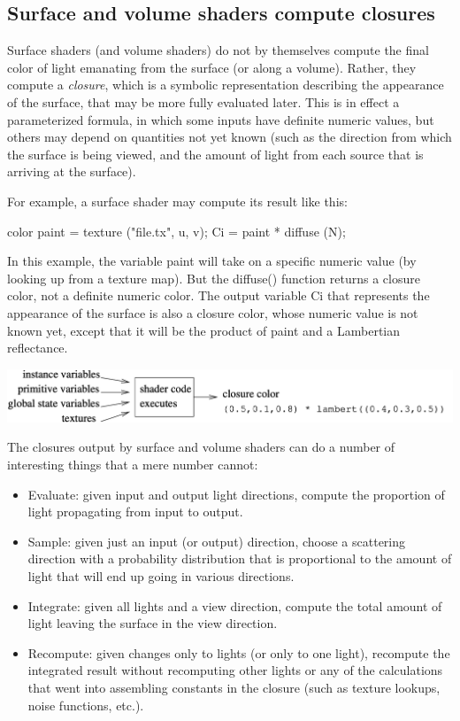 \documentclass[11pt,letterpaper]{book}
\def\color{{\cf color}\xspace}
\def\colorclosure{{\cf closure color}\xspace}
\begin{document}
\subsection*{Surface and volume shaders compute closures}

Surface shaders (and volume shaders) do not by themselves compute the
final color of light emanating from the surface (or along a volume).
Rather, they compute a \emph{closure}, which is a symbolic representation
describing the appearance of the surface, that may be more fully
evaluated later.  This is in effect a parameterized formula, in which
some inputs have definite numeric values, but others may depend on
quantities not yet known (such as the direction from which the surface
is being viewed, and the amount of light from each source that is
arriving at the surface).

For example, a surface shader may compute its result like this:

\begin{code}
    color paint = texture ("file.tx", u, v);
    Ci = paint * diffuse (N);
\end{code}

\noindent In this example, the variable {\cf paint} will take on a
specific numeric value (by looking up from a texture map).  But the {\cf
  diffuse()} function returns a \colorclosure, not a definite numeric
\color.  The output variable {\cf Ci} that represents the appearance of
the surface is also a \colorclosure, whose numeric value is not known
yet, except that it will be the product of {\cf paint} and a Lambertian
reflectance.

\bigskip

\includegraphics{Figures/shaderexecschematic}

\medskip

The closures output by surface and volume shaders can do a number of
interesting things that a mere number cannot:

\begin{itemize}
\item Evaluate: given input and output light directions, compute the
  proportion of light propagating from input to output.
\item Sample: given just an input (or output) direction, choose a
  scattering direction with a probability distribution that is
  proportional to the amount of light that will end up going in various
  directions.
\item Integrate: given all lights and a view direction, compute
  the total amount of light leaving the surface in the view direction.
\item Recompute: given changes only to lights (or only to one light),
  recompute the integrated result without recomputing other lights or
  any of the calculations that went into assembling constants in the
  closure (such as texture lookups, noise functions, etc.).
\end{itemize}
\end{document}
